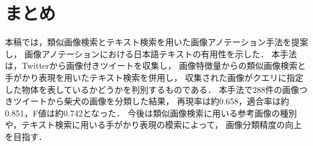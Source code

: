 \chapter{まとめ}
\label{sec:format}
本稿では，類似画像検索とテキスト検索を用いた画像アノテーション手法を提案し，
画像アノテーションにおける日本語テキストの有用性を示した．
本手法は，Twitterから画像付きツイートを収集し，
画像特徴量からの類似画像検索と手がかり表現を用いたテキスト検索を併用し，
収集された画像がクエリに指定した物体を表しているかどうかを判別するものである．
本手法で288件の画像つきツイートから柴犬の画像を分類した結果，
再現率は約0.658，適合率は約0.851，F値は約0.742となった．
今後は類似画像検索に用いる参考画像の種別や，テキスト検索に用いる手がかり表現の模索によって，
画像分類精度の向上を目指す．